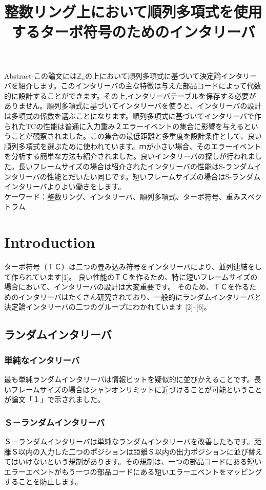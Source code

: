 \documentclass[20 pts]{article}
\title{整数リング上において順列多項式を使用するターボ符号のためのインタリーバ}
\date{}
\begin{document}
\maketitle

Abstract-この論文には$\mathbb{Z}_n$の上において順列多項式に基づいて決定論インタリーバを紹介します。このインタリーバの主な特徴は与えた部品コードによって代数的に設計することができます。その上,インタリーバテーブルを保存する必要がありません。順列多項式に基づいてインタリーバを使うと、インタリーバの設計は多項式の係数を選ぶことになります。順列多項式に基づいてインタリーバで作られたTCの性能は普通に入力重み２エラーイベントの集合に影響を与えるということが観察されました。この集合の最低距離と多重度を設計条件として、良い順列多項式を選ぶために使われています。ｍが小さい場合、そのエラーイベントを分析する簡単な方法も紹介されました。良いインタリーバの探しが行われました。長いフレームサイズの場合は紹介されたインタリーバの性能はS-ランダムインタリーバの性能とだいたい同じです。短いフレームサイズの場合はS-ランダムインタリーバよりよい働きをします。\\
ケーワード：整数リング、インタリーバ、順列多項式、ターボ符号、重みスべクトラム
\section{Introduction}
 ターボ符号（ＴＣ）は二つの畳み込み符号をインタリーバにより、並列連結をして作られています[1]。 
良い性能のＴＣを作るため、特に短いフレームサイズの場合において、インタリーバの設計は大変重要です。
そのため、ＴＣを作るためのインタリーバはたくさん研究されており、一般的にランダムインタリーバと決定論インタリーバの二つのグループにわかれています [2]–[6]。

\subsection{ランダムインタリーバ}

\subsubsection{単純なインタリーバ}
最も単純ランダムインタリーバは情報ビットを疑似的に並びかえることです。長いフレームサイズの場合はシャンオンリミットに近づけることが可能ということが論文「１」で示されました。

\subsubsection{Ｓ－ランダムインタリーバ}
Ｓ－ランダムインタリーバは単純なランダムインタリーバを改善したもです。距離Ｓ以内の入力した二つのポジションは距離Ｓ以内の出力ポジションに並び替えてはいけないという規制があります。その規制は、一つの部品コードにある短いエラーエベントがもう一つの部品コードにある短いエラーエベントをマッピングすることを防止します。
\end{document}
